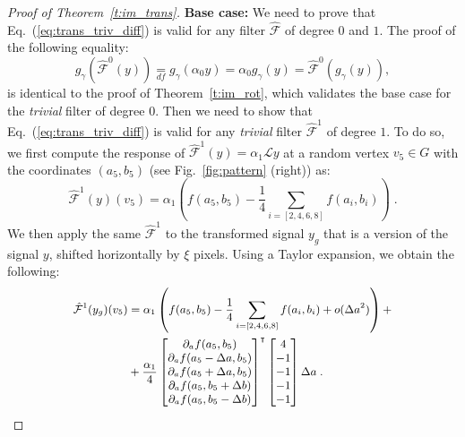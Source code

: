 \documentclass[10pt,journal,compsoc]{IEEEtran}
\newcommand{\df}{\mathop{=}\limits_{df}}
\newcommand{\hmF}{\hat{\mathcal{F}}}
\begin{document}
\begin{proof}[Proof of Theorem~\ref{t:im_trans}]
		\textbf{Base case:} We need to prove that Eq.~(\ref{eq:trans_triv_diff}) is valid for any filter $\hmF$ of degree $0$ and $1$. The proof of the following equality:
		\begin{equation}
		g_\gamma\left(\hmF^0 (y)\right) \df g_\gamma(\alpha_0 y) = \alpha_0 g_\gamma(y) = \hmF^0 (g_\gamma(y)),
		\label{eq:filt_diff_rot_zero_deg_shift}
		\end{equation}
		is identical to the proof of Theorem~\ref{t:im_rot}, which validates the base case for the \emph{trivial} filter of degree 0. Then we need to show that Eq.~(\ref{eq:trans_triv_diff}) is valid for any \emph{trivial} filter $\hmF^{1}$ of degree $1$. To do so, we first compute the response of $\hmF^1(y) = \alpha_1 \mathcal{L} y$ at a random vertex $v_5 \in G$ with the coordinates $(a_5,b_5)$ (see Fig.~\ref{fig:pattern} (right)) as:
		\begin{equation}
		\hmF^1(y)(v_5) = \alpha_1\left(f(a_5,b_5) - \frac{1}{4}\sum_{i=[2,4,6,8]}f(a_i,b_i)\right) \;.
		\label{eq:response_mb}
		\end{equation}
		\noindent
		We then apply the same $\hmF^1$ to the transformed signal $y_{g}$ that is a version of the signal $y$, shifted horizontally  by $\xi$ pixels. Using a Taylor expansion, we obtain the following:
		\begin{equation}
		\small
		\begin{aligned}
		\hmF^1(y_g)(v_5) & = \alpha_1\left(f(a_5,b_5) - \frac{1}{4}\sum_{i=[2,4,6,8]}f(a_i,b_i)  + o(\Delta a^2)\right) + \\
		& + \frac{\alpha_1}{4}
		\begin{bmatrix}
		\partial_a f(a_5,b_5) \\
		\partial_a f(a_5-\Delta a, b_5) \\
		\partial_a f(a_5+\Delta a, b_5) \\
		\partial_a f(a_5, b_5+\Delta b) \\
		\partial_a f(a_5, b_5-\Delta b) \\
		\end{bmatrix}^\intercal
		\begin{bmatrix}
		4 \\ -1 \\ -1 \\ -1 \\ -1 \\
		\end{bmatrix} \Delta a \;.
		\end{aligned}
		\label{eq:response_mafter}
		\end{equation}

\end{proof}
\end{document}
